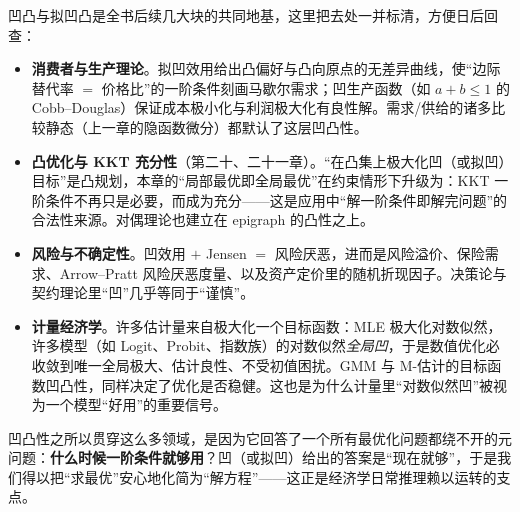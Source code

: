 凹凸与拟凹凸是全书后续几大块的共同地基，这里把去处一并标清，方便日后回查：

\begin{itemize}
    \item \textbf{消费者与生产理论}。拟凹效用给出凸偏好与凸向原点的无差异曲线，使``边际替代率 $=$ 价格比''的一阶条件刻画马歇尔需求；凹生产函数（如 $a+b\le1$ 的 Cobb--Douglas）保证成本极小化与利润极大化有良性解。需求/供给的诸多比较静态（上一章的隐函数微分）都默认了这层凹凸性。
    \item \textbf{凸优化与 KKT 充分性}（第二十、二十一章）。``在凸集上极大化凹（或拟凹）目标''是凸规划，本章的``局部最优即全局最优''在约束情形下升级为：KKT 一阶条件不再只是必要，而成为充分——这是应用中``解一阶条件即解完问题''的合法性来源。对偶理论也建立在 epigraph 的凸性之上。
    \item \textbf{风险与不确定性}。凹效用 $+$ Jensen $=$ 风险厌恶，进而是风险溢价、保险需求、Arrow--Pratt 风险厌恶度量、以及资产定价里的随机折现因子。决策论与契约理论里``凹''几乎等同于``谨慎''。
    \item \textbf{计量经济学}。许多估计量来自极大化一个目标函数：MLE 极大化对数似然，许多模型（如 Logit、Probit、指数族）的对数似然\emph{全局凹}，于是数值优化必收敛到唯一全局极大、估计良性、不受初值困扰。GMM 与 M-估计的目标函数凹凸性，同样决定了优化是否稳健。这也是为什么计量里``对数似然凹''被视为一个模型``好用''的重要信号。
\end{itemize}

凹凸性之所以贯穿这么多领域，是因为它回答了一个所有最优化问题都绕不开的元问题：\textbf{什么时候一阶条件就够用}？凹（或拟凹）给出的答案是``现在就够''，于是我们得以把``求最优''安心地化简为``解方程''——这正是经济学日常推理赖以运转的支点。
